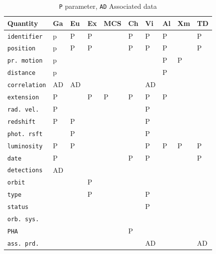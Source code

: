 \documentclass[11pt,a4paper]{ivoa}
\begin{document}
\begin{table}[ht!]
     \tiny
     \begin{tabular}{|p{2.4cm}|p{0.4cm}|p{0.4cm}|p{0.4cm}|p{0.6cm}|p{0.4cm}|p{0.4cm}|p{0.4cm}|p{0.4cm}|p{0.4cm}|}
       \hline Quantity &  Ga &  Eu &  Ex &  MCS  &  Ch&  Vi &  Al &  Xm&  TD \\
       \hline  \texttt{identifier}      &  p & P  &P& &P&P &P&  & P \\              
       \hline  \texttt{position}      &  p & P  &P& &P&P &P&  & P \\       
       \hline  \texttt{pr. motion}   & p &   &   &    &  &   &P&P&    \\       
       \hline  \texttt{distance}     & p &   &   &    &  &   &P&  &    \\       
       \hline  \texttt{correlation}   & AD &AD&   &    &  &AD &   &  &    \\       
       \hline  \texttt{extension}     &P&   &P&P &P&P& P&  &    \\       
       \hline  \texttt{rad. vel.}       &  P &   &   &    &  &P&   &  &    \\       
       \hline  \texttt{redshift}        &  P &P&   &    &  &P&   &  &    \\             
       \hline  \texttt{phot. rsft}      &   &P&   &    &  &P&   &  &    \\       
       \hline  \texttt{luminosity}    & P&P&   &    &  &P&P&P&P\\       
       \hline  \texttt{date}             & P  &   &   &    & P&P&   &  &P\\       
       \hline  \texttt{detections}    &  AD &   &   &    &  &   &   &  &    \\       
       \hline  \texttt{orbit}             &   &   &P& &  &   &   &  &    \\       
       \hline  \texttt{type}             &   &   & P& &  &P&   &  &    \\      
       \hline  \texttt{status}          &   &   &   &    &  &P&   &  &    \\       
       \hline  \texttt{orb. sys.}      &   &   &   &    &  &   &   &  &    \\       
       \hline  \texttt{PHA}            &   &   &   &    &P&   &   &  &    \\       
       \hline  \texttt{ass. prd.}     &   &   &   &    &  &AD&   &  &AD \\       
       \hline 
     \end{tabular}
     \caption{ \texttt{P} parameter, \texttt{AD} Associated data} 
 \end{table}
\end{document}
